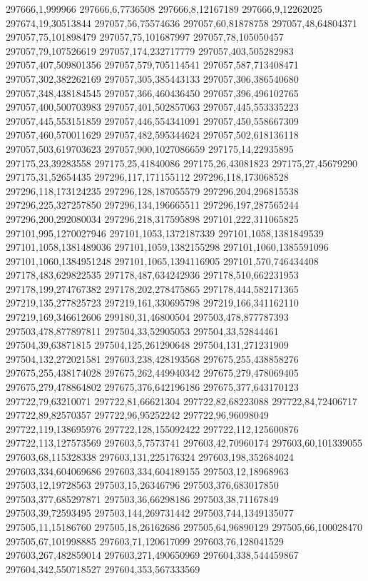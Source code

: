 297666,1,999966
297666,6,7736508
297666,8,12167189
297666,9,12262025
297674,19,30513844
297057,56,75574636
297057,60,81878758
297057,48,64804371
297057,75,101898479
297057,75,101687997
297057,78,105050457
297057,79,107526619
297057,174,232717779
297057,403,505282983
297057,407,509801356
297057,579,705114541
297057,587,713408471
297057,302,382262169
297057,305,385443133
297057,306,386540680
297057,348,438184545
297057,366,460436450
297057,396,496102765
297057,400,500703983
297057,401,502857063
297057,445,553335223
297057,445,553151859
297057,446,554341091
297057,450,558667309
297057,460,570011629
297057,482,595344624
297057,502,618136118
297057,503,619703623
297057,900,1027086659
297175,14,22935895
297175,23,39283558
297175,25,41840086
297175,26,43081823
297175,27,45679290
297175,31,52654435
297296,117,171155112
297296,118,173068528
297296,118,173124235
297296,128,187055579
297296,204,296815538
297296,225,327257850
297296,134,196665511
297296,197,287565244
297296,200,292080034
297296,218,317595898
297101,222,311065825
297101,995,1270027946
297101,1053,1372187339
297101,1058,1381849539
297101,1058,1381489036
297101,1059,1382155298
297101,1060,1385591096
297101,1060,1384951248
297101,1065,1394116905
297101,570,746434408
297178,483,629822535
297178,487,634242936
297178,510,662231953
297178,199,274767382
297178,202,278475865
297178,444,582171365
297219,135,277825723
297219,161,330695798
297219,166,341162110
297219,169,346612606
299180,31,46800504
297503,478,877787393
297503,478,877897811
297504,33,52905053
297504,33,52844461
297504,39,63871815
297504,125,261290648
297504,131,271231909
297504,132,272021581
297603,238,428193568
297675,255,438858276
297675,255,438174028
297675,262,449940342
297675,279,478069405
297675,279,478864802
297675,376,642196186
297675,377,643170123
297722,79,63210071
297722,81,66621304
297722,82,68223088
297722,84,72406717
297722,89,82570357
297722,96,95252242
297722,96,96098049
297722,119,138695976
297722,128,155092422
297722,112,125600876
297722,113,127573569
297603,5,7573741
297603,42,70960174
297603,60,101339055
297603,68,115328338
297603,131,225176324
297603,198,352684024
297603,334,604069686
297603,334,604189155
297503,12,18968963
297503,12,19728563
297503,15,26346796
297503,376,683017850
297503,377,685297871
297503,36,66298186
297503,38,71167849
297503,39,72593495
297503,144,269731442
297503,744,1349135077
297505,11,15186760
297505,18,26162686
297505,64,96890129
297505,66,100028470
297505,67,101998885
297603,71,120617099
297603,76,128041529
297603,267,482859014
297603,271,490650969
297604,338,544459867
297604,342,550718527
297604,353,567333569
